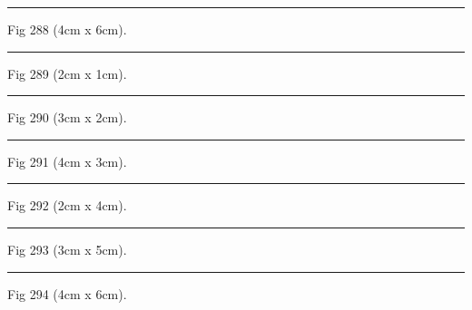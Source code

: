 \documentclass[a4paper,11pt]{article}
\begin{document}
\begin{swarmwrap}%
  \begin{minipage}[t]{4cm}
    \centering
    \rule{\linewidth}{6cm}
    {\footnotesize Fig 288 (4cm x 6cm).}
  \end{minipage}%
\end{swarmwrap}%
\swarmwrapnext
\lipsum[138]%

\begin{swarmwrap}%
  \begin{minipage}[t]{2cm}
    \centering
    \rule{\linewidth}{1cm}
    {\footnotesize Fig 289 (2cm x 1cm).}
  \end{minipage}%
\end{swarmwrap}%
\swarmwrapnext
\lipsum[139]%

\begin{swarmwrap}%
  \begin{minipage}[t]{3cm}
    \centering
    \rule{\linewidth}{2cm}
    {\footnotesize Fig 290 (3cm x 2cm).}
  \end{minipage}%
\end{swarmwrap}%
\swarmwrapnext
\lipsum[140]%

\begin{swarmwrap}%
  \begin{minipage}[t]{4cm}
    \centering
    \rule{\linewidth}{3cm}
    {\footnotesize Fig 291 (4cm x 3cm).}
  \end{minipage}%
\end{swarmwrap}%
\swarmwrapnext
\lipsum[141]%

\begin{swarmwrap}%
  \begin{minipage}[t]{2cm}
    \centering
    \rule{\linewidth}{4cm}
    {\footnotesize Fig 292 (2cm x 4cm).}
  \end{minipage}%
\end{swarmwrap}%
\swarmwrapnext
\lipsum[142]%

\begin{swarmwrap}%
  \begin{minipage}[t]{3cm}
    \centering
    \rule{\linewidth}{5cm}
    {\footnotesize Fig 293 (3cm x 5cm).}
  \end{minipage}%
\end{swarmwrap}%
\swarmwrapnext
\lipsum[143]%

\begin{swarmwrap}%
  \begin{minipage}[t]{4cm}
    \centering
    \rule{\linewidth}{6cm}
    {\footnotesize Fig 294 (4cm x 6cm).}
  \end{minipage}%
\end{swarmwrap}%
\swarmwrapnext
\lipsum[144]%
\end{document}
